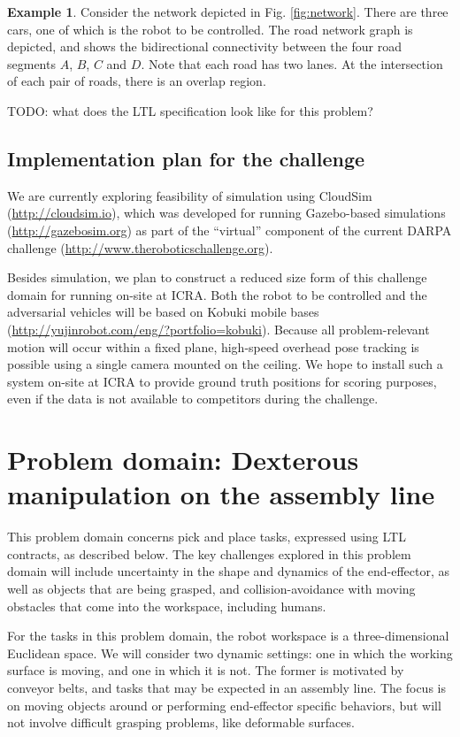\documentclass{amsart}
\theoremstyle{definition}
\newtheorem{example}{Example}[section]
\begin{document}
\begin{example}
Consider the network depicted in Fig. \ref{fig:network}. There are three cars,
one of which is the robot to be controlled. The road network graph is depicted,
and shows the bidirectional connectivity between the four road segments $A$,
$B$, $C$ and $D$. Note that each road has two lanes. At the intersection of each
pair of roads, there is an overlap region.
\end{example}

TODO: what does the LTL specification look like for this problem?

\subsection{Implementation plan for the challenge}

We are currently exploring feasibility of simulation using CloudSim
(\url{http://cloudsim.io}), which was developed for running Gazebo-based
simulations (\url{http://gazebosim.org}) as part of the ``virtual'' component of
the current DARPA challenge (\url{http://www.theroboticschallenge.org}).

Besides simulation, we plan to construct a reduced size form of this challenge
domain for running on-site at ICRA.  Both the robot to be controlled and the
adversarial vehicles will be based on Kobuki mobile bases
(\url{http://yujinrobot.com/eng/?portfolio=kobuki}).  Because all
problem-relevant motion will occur within a fixed plane, high-speed overhead
pose tracking is possible using a single camera mounted on the ceiling.  We hope
to install such a system on-site at ICRA to provide ground truth positions for
scoring purposes, even if the data is not available to competitors during the
challenge.

\section{Problem domain: Dexterous manipulation on the assembly line}\label{sec:dexterousmanip}

This problem domain concerns pick and place tasks, expressed using LTL
contracts, as described below. The key challenges explored in this problem
domain will include uncertainty in the shape and dynamics of the end-effector,
as well as objects that are being grasped, and collision-avoidance with moving
obstacles that come into the workspace, including humans.

For the tasks in this problem domain, the robot workspace is a three-dimensional
Euclidean space. We will consider two dynamic settings: one in which the working
surface is moving, and one in which it is not.  The former is motivated by
conveyor belts, and tasks that may be expected in an assembly line. The focus is
on moving objects around or performing end-effector specific behaviors, but will
not involve difficult grasping problems, like deformable surfaces.
\end{document}
